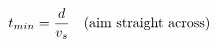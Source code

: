 \documentclass[preview]{standalone}
\begin{document}
\begin{align*}
\special{dvisvgm:raw <g id='unique000'>}t_{min} = \frac{d}{v_s} \quad \text{(aim straight across)}\special{dvisvgm:raw </g>}
\end{align*}
\end{document}
